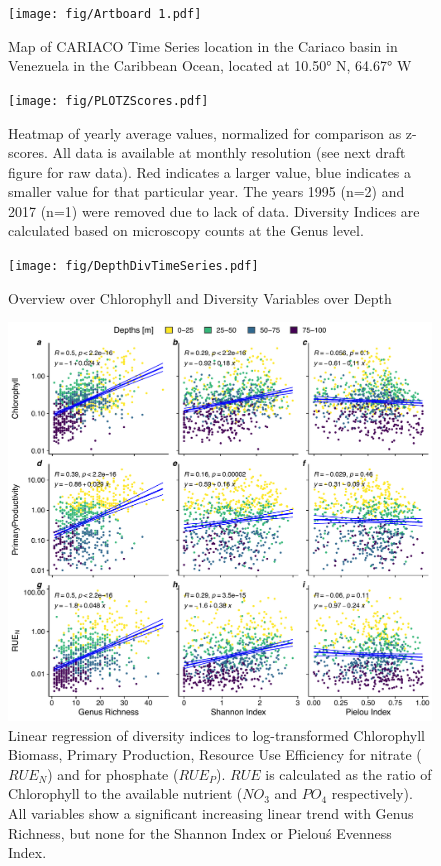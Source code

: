 \documentclass[draft]{agujournal2019}
\begin{document}
\begin{figure}
\noindent\texttt{[image: fig/Artboard 1.pdf]}
\caption{Map of CARIACO Time Series location in the Cariaco basin in Venezuela in the Caribbean Ocean, located at 10.50° N, 64.67° W}
\end{figure}

\begin{figure}
\noindent\texttt{[image: fig/PLOTZScores.pdf]}
\caption{Heatmap of yearly average values, normalized for comparison as z-scores. All data is available at monthly resolution (see next draft figure for raw data). Red indicates a larger value, blue indicates a smaller value for that particular year. The years 1995 (n=2) and 2017 (n=1) were removed due to lack of data. Diversity Indices are calculated based on microscopy counts at the Genus level.}
\end{figure}

\begin{figure}
\begin{center}
\noindent\texttt{[image: fig/DepthDivTimeSeries.pdf]}
\end{center}
\caption{Overview over Chlorophyll and Diversity Variables over Depth}
\end{figure}


\begin{figure}
\noindent\includegraphics[width=\textwidth]{fig/BDEF_depth_PLOT.pdf}
\caption{Linear regression of diversity indices to log-transformed Chlorophyll Biomass, Primary Production, Resource Use Efficiency for nitrate ($RUE_N$) and for phosphate ($RUE_P$). $RUE$ is calculated as the ratio of Chlorophyll to the available nutrient ($NO_3$ and $PO_4$ respectively). All variables show a significant increasing linear trend with Genus Richness, but none for the Shannon Index or Pielou\'s Evenness Index.}
\end{figure}
\end{document}
